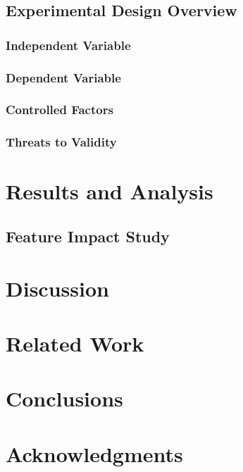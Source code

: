 \documentclass{sig-alternate}
\begin{document}
\subsection{Experimental Design Overview}
\subsubsection{Independent Variable}
\subsubsection{Dependent Variable }
\subsubsection{Controlled Factors}
\subsubsection{Threats to Validity}	

\section{Results and Analysis}

\subsection{Feature Impact Study}
\subsection{ }

\section{Discussion}

\section{Related Work}

\section{Conclusions}

\section{Acknowledgments}

%

%
%
\end{document}
